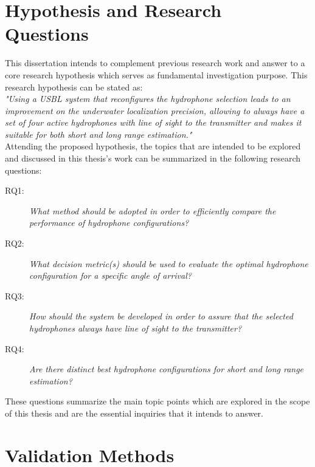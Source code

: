 \section{Hypothesis and Research Questions} \label{sec:hypoth-rq}

This dissertation intends to complement previous research work and answer to a core research hypothesis which serves as fundamental investigation purpose. This research hypothesis can be stated as:
\\

\textit{"Using a USBL system that reconfigures the hydrophone selection leads to an improvement on the underwater localization precision, allowing to always have a set of four active hydrophones with line of sight to the transmitter and makes it suitable for both short and long range estimation."}
\\

Attending the proposed hypothesis, the topics that are intended to be explored and discussed in this thesis's work can be summarized in the following research questions:

\begin{description}
	\item[RQ1: ] \textit{What method should be adopted in order to efficiently compare the performance of hydrophone configurations?}
	
	\item[RQ2: ] \textit{What decision metric(s) should be used to evaluate the optimal hydrophone configuration for a specific angle of arrival?}
	
	\item[RQ3: ]\textit{How should the system be developed in order to assure that the selected hydrophones always have line of sight to the transmitter?}
	
	\item[RQ4: ] \textit{Are there distinct best hydrophone configurations for short and long range estimation?}
\end{description}

These questions summarize the main topic points which are explored in the scope of this thesis and are the essential inquiries that it intends to answer.

\section{Validation Methods} \label{sec:validation}

